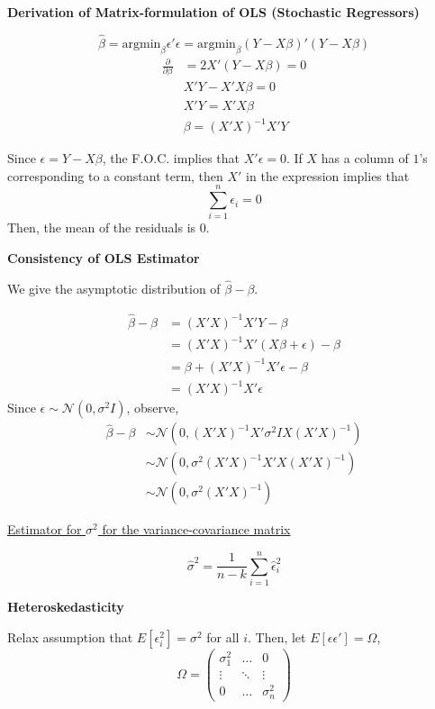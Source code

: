 \documentclass[16pt]{article}
\newcommand{\bh}{\hat{\beta}}
\newcommand{\argmin}{\text{argmin}}
\newcommand{\norm}{\mathcal{N}}
\begin{document}
\textbf{Derivation of Matrix-formulation of OLS (Stochastic Regressors)}

$$\bh = \argmin_{\beta} \epsilon'\epsilon = \argmin_{\beta} (Y - X\beta)'(Y - X\beta)$$
\begin{align*}
  \frac{\partial}{\partial \beta} &= 2X' (Y - X \beta) = 0\\
    &X'Y - X'X\beta = 0\\
    &X'Y = X'X\beta\\
    &\beta = (X'X)^{-1} X'Y
\end{align*}

Since $\epsilon = Y - X\beta$, the F.O.C. implies that $X'\epsilon = 0$. If $X$ has a column of $1$'s corresponding to a constant term, then $X'$ in the expression implies that 
$$\sum_{i=1}^n \epsilon_i = 0$$
Then, the mean of the residuals is $0$. 

\textbf{Consistency of OLS Estimator}

We give the asymptotic distribution of $\bh - \beta$.

\begin{align*}
  \bh - \beta &= (X'X)^{-1}X'Y - \beta\\
              &= (X'X)^{-1} X'(X\beta + \epsilon) - \beta\\
              &= \beta + (X'X)^{-1}X'\epsilon - \beta\\
              &= (X'X)^{-1}X'\epsilon
\end{align*}
Since $\epsilon \sim \norm(0, \sigma^2 I)$, observe,
\begin{align*}
  \bh - \beta &\sim \norm(0, (X'X)^{-1} X' \sigma^2 I X(X'X)^{-1})\\
              &\sim \norm(0, \sigma^2 (X'X)^{-1}X'X(X'X)^{-1})\\
              &\sim \norm(0, \sigma^2(X'X)^{-1})
\end{align*}

\underline{Estimator for $\sigma^2$ for the variance-covariance matrix}

$$\hat{\sigma}^2 = \frac{1}{n-k} \sum_{i=1}^n \hat{\epsilon}_i^2$$

\textbf{Heteroskedasticity}

Relax assumption that $E[\epsilon_i^2] = \sigma^2$ for all $i$. Then, let $E[\epsilon \epsilon'] = \Omega$,
$$\Omega = \begin{pmatrix} 
  \sigma_1^2 & \dots & 0\\
  \vdots & \ddots & \vdots\\
  0 & \dots & \sigma_n^2
\end{pmatrix}$$
\end{document}
